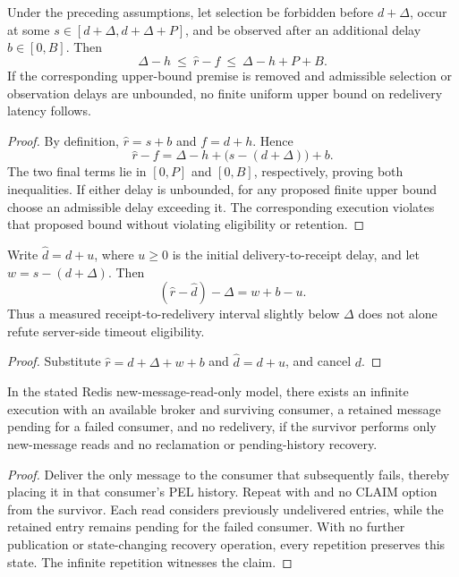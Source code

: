 \begin{theorem}\label{thm:recovery}
Under the preceding assumptions, let selection be forbidden before $d+\Delta$, occur at some $s\in[d+\Delta,d+\Delta+P]$, and be observed after an additional delay $b\in[0,B]$. Then
\[
\Delta-h\ \leq\ \widehat r-f\ \leq\ \Delta-h+P+B.
\]
If the corresponding upper-bound premise is removed and admissible selection or observation delays are unbounded, no finite uniform upper bound on redelivery latency follows.
\end{theorem}
\begin{proof}
By definition, $\widehat r=s+b$ and $f=d+h$. Hence
\[
\widehat r-f=\Delta-h+\bigl(s-(d+\Delta)\bigr)+b.
\]
The two final terms lie in $[0,P]$ and $[0,B]$, respectively, proving both inequalities. If either delay is unbounded, for any proposed finite upper bound choose an admissible delay exceeding it. The corresponding execution violates that proposed bound without violating eligibility or retention.
\end{proof}

\begin{corollary}\label{cor:observed}
Write $\widehat d=d+u$, where $u\geq0$ is the initial delivery-to-receipt delay, and let $w=s-(d+\Delta)$. Then
\[
(\widehat r-\widehat d)-\Delta=w+b-u.
\]
Thus a measured receipt-to-redelivery interval slightly below $\Delta$ does not alone refute server-side timeout eligibility.
\end{corollary}
\begin{proof}
Substitute $\widehat r=d+\Delta+w+b$ and $\widehat d=d+u$, and cancel $d$.
\end{proof}

\begin{proposition}\label{prop:no-reclaim}
In the stated Redis new-message-read-only model, there exists an infinite execution with an available broker and surviving consumer, a retained message pending for a failed consumer, and no redelivery, if the survivor performs only new-message reads and no reclamation or pending-history recovery.
\end{proposition}
\begin{proof}
Deliver the only message to the consumer that subsequently fails, thereby placing it in that consumer's PEL history. Repeat  with \code{>} and no CLAIM option from the survivor. Each read considers previously undelivered entries, while the retained entry remains pending for the failed consumer. With no further publication or state-changing recovery operation, every repetition preserves this state. The infinite repetition witnesses the claim.
\end{proof}


